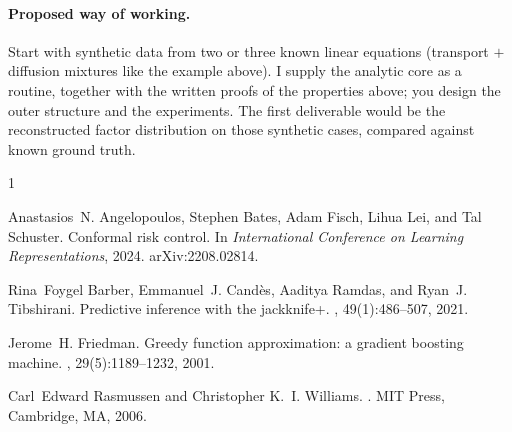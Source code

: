 \documentclass[11pt]{article}
\theoremstyle{plain}
\theoremstyle{definition}
\theoremstyle{remark}
\begin{document}
\paragraph{Proposed way of working.}
Start with synthetic data from two or three known linear equations (transport $+$ diffusion mixtures like the example above). I supply the analytic core as a routine, together with the written proofs of the properties above; you design the outer structure and the experiments. The first deliverable would be the reconstructed factor distribution on those synthetic cases, compared against known ground truth.





\begin{thebibliography}{1}

Anastasios~N. Angelopoulos, Stephen Bates, Adam Fisch, Lihua Lei, and Tal
  Schuster.
\newblock Conformal risk control.
\newblock In {\em International Conference on Learning Representations}, 2024.
\newblock arXiv:2208.02814.

Rina~Foygel Barber, Emmanuel~J. Cand{\`e}s, Aaditya Ramdas, and Ryan~J.
  Tibshirani.
\newblock Predictive inference with the jackknife+.
, 49(1):486--507, 2021.

Jerome~H. Friedman.
\newblock Greedy function approximation: a gradient boosting machine.
, 29(5):1189--1232, 2001.

Carl~Edward Rasmussen and Christopher K.~I. Williams.
.
\newblock MIT Press, Cambridge, MA, 2006.

\end{thebibliography}
\end{document}
